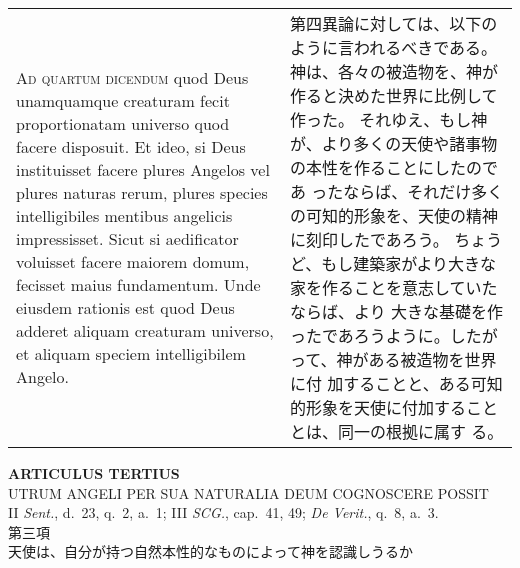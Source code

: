 \documentclass[10pt]{jsarticle} %
\begin{document}
\begin{longtable}{p{21em}p{21em}}
\\


{\scshape Ad quartum dicendum} quod Deus unamquamque
creaturam fecit proportionatam universo quod facere disposuit. Et ideo,
si Deus instituisset facere plures Angelos vel plures naturas rerum,
plures species intelligibiles mentibus angelicis impressisset. Sicut si
aedificator voluisset facere maiorem domum, fecisset maius
fundamentum. Unde eiusdem rationis est quod Deus adderet aliquam
creaturam universo, et aliquam speciem intelligibilem Angelo.

&

 第四異論に対しては、以下のように言われるべきである。
 神は、各々の被造物を、神が作ると決めた世界に比例して作った。
 それゆえ、もし神が、より多くの天使や諸事物の本性を作ることにしたのであ
 ったならば、それだけ多くの可知的形象を、天使の精神に刻印したであろう。
 ちょうど、もし建築家がより大きな家を作ることを意志していたならば、より
 大きな基礎を作ったであろうように。したがって、神がある被造物を世界に付
 加することと、ある可知的形象を天使に付加することとは、同一の根拠に属す
 る。



\end{longtable}
\newpage


\begin{center}
 {\Large {\bf ARTICULUS TERTIUS}}\\
 {\large UTRUM ANGELI PER SUA NATURALIA DEUM COGNOSCERE POSSIT}\\
 {\footnotesize II {\itshape Sent.}, d.~23, q.~2, a.~1; III {\itshape SCG.}, cap.~41, 49; {\itshape De Verit.}, q.~8, a.~3.}\\
 {\Large 第三項\\天使は、自分が持つ自然本性的なものによって神を認識しうるか}
\end{center}
\end{document}
